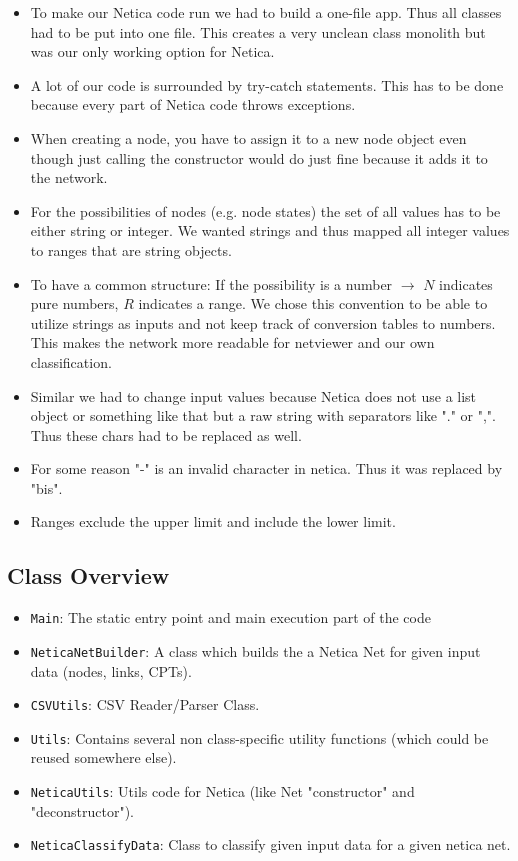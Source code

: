 \documentclass[12pt]{scrartcl}
\begin{document}
\begin{itemize}
    \item To make our Netica code run we had to build a one-file app. Thus all classes had to be put into one file. This creates a very unclean class monolith but was our only working option for Netica.
    \item A lot of our code is surrounded by try-catch statements. This has to be done because every part of Netica code throws exceptions.
    \item When creating a node, you have to assign it to a new node object even though just calling the constructor would do just fine because it adds it to the network.
    \item For the possibilities of nodes (e.g. node states) the set of all values has to be either string or integer. We wanted strings and thus mapped all integer values to ranges that are string objects.
    \item To have a common structure: If the possibility is a number $\rightarrow$ $N$ indicates pure numbers, $R$ indicates a range.
    We chose this convention to be able to utilize strings as inputs and not keep track of conversion tables to numbers. This makes the network more readable for netviewer and our own classification.
    \item Similar we had to change input values because Netica does not use a list object or something like that but a raw string with separators like "." or ",". Thus these chars had to be replaced as well.
    \item For some reason "-" is an invalid character in netica. Thus it was replaced by "bis".
    \item Ranges exclude the upper limit and include the lower limit.
\end{itemize}


\subsection{Class Overview}
\begin{itemize}
    \item \texttt{Main}: The static entry point and main execution part of the code
    \item \texttt{NeticaNetBuilder}: A class which builds the a Netica Net for given input data (nodes, links, CPTs).
    \item \texttt{CSVUtils}: CSV Reader/Parser Class.
    \item \texttt{Utils}: Contains several non class-specific utility functions (which could be reused somewhere else).
    \item \texttt{NeticaUtils}: Utils code for Netica (like Net "constructor" and "deconstructor").
    \item \texttt{NeticaClassifyData}: Class to classify given input data for a given netica net.
\end{itemize}
\end{document}
